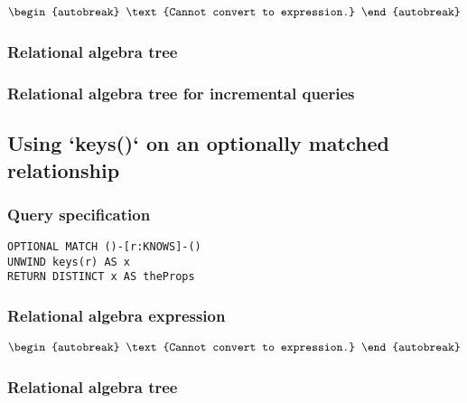 \begin{align*}
\begin{autobreak}
\text{Cannot convert to expression.}
\end{autobreak}
\end{align*}

\subsubsection*{Relational algebra tree}


\subsubsection*{Relational algebra tree for incremental queries}


\subsection{Using `keys()` on an optionally matched relationship}

\subsubsection*{Query specification}

\begin{lstlisting}
OPTIONAL MATCH ()-[r:KNOWS]-()
UNWIND keys(r) AS x
RETURN DISTINCT x AS theProps
\end{lstlisting}

\subsubsection*{Relational algebra expression}

\begin{align*}
\begin{autobreak}
\text{Cannot convert to expression.}
\end{autobreak}
\end{align*}

\subsubsection*{Relational algebra tree}


